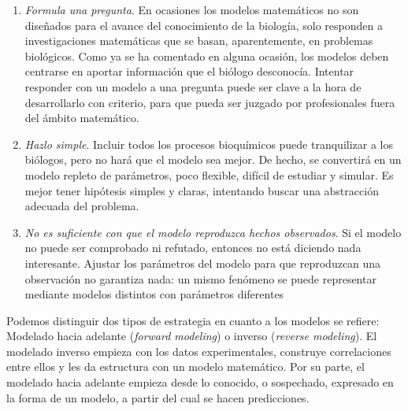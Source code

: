 \begin{enumerate}
	\item \textit{Formula una pregunta}. En ocasiones los modelos matemáticos no son diseñados para el avance del conocimiento de la biología, solo responden a investigaciones matemáticas que se basan, aparentemente, en problemas biológicos. Como ya se ha comentado en alguna ocasión, los modelos deben centrarse en aportar información que el biólogo desconocía. Intentar responder con un modelo a una pregunta puede ser clave a la hora de desarrollarlo con criterio, para que pueda ser juzgado por profesionales fuera del ámbito matemático. 
	
	\item \textit{Hazlo simple}. Incluir todos los procesos bioquímicos puede tranquilizar a los biólogos, pero no hará que el modelo sea mejor. De hecho, se convertirá en un modelo repleto de parámetros, poco flexible, difícil de estudiar y simular. Es mejor tener hipótesis simples y claras, intentando buscar una abstracción adecuada del problema.
	
	\item \textit{No es suficiente con que el modelo reproduzca hechos observados}. Si el modelo no puede ser comprobado ni  refutado, entonces no está diciendo nada interesante. Ajustar los parámetros del modelo  para que reproduzcan una observación no garantiza nada: un mismo fenómeno se puede representar mediante modelos distintos con parámetros diferentes
\end{enumerate}

Podemos distinguir dos tipos de estrategia en cuanto a los modelos se refiere: Modelado hacia adelante (\textit{forward modeling}) o inverso (\textit{reverse modeling}). El modelado inverso empieza con los datos experimentales, construye correlaciones entre ellos y les da estructura con un modelo matemático. Por su parte, el modelado hacia adelante empieza desde lo conocido, o sospechado, expresado en la forma de un modelo, a partir del cual se hacen predicciones. 

